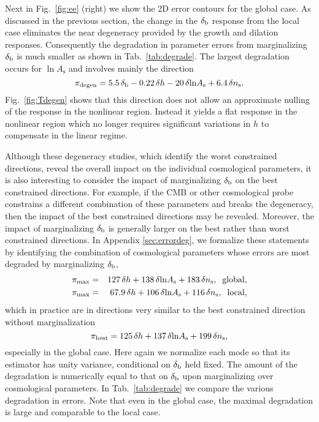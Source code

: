 \documentclass[prd,twocolumn,amsmath,amssymb,floatfix,superscriptaddress]{revtex4-1}
\newcommand{\lnAs}{{\ln\!A_\textrm{s}}}
\newcommand{\ns}{{n_\textrm{s}}}
\newcommand{\br}{{\rm b}}
\begin{document}
{{Next in Fig.~\ref{fig:ee} (right) we show the 2D error contours for
the global case.   As discussed in the previous
section, the change in the $\delta_\br$ response from the local case eliminates
the near degeneracy provided by the growth and dilation responses.
Consequently the degradation in parameter errors from marginalizing $\delta_\br$ 
is much smaller as shown in Tab.~\ref{tab:degrade}.    The largest degradation occurs for
$\lnAs$ and involves mainly the direction 
\begin{equation}
    \pi_{\rm degen} = 5.5\,\delta_\br - 0.22\,\delta h - 20\,\delta\lnAs + 6.4\,\delta\ns.
    \label{eq:globaldegeneracy}
\end{equation}
Fig.~\ref{fig:Tdegen} shows that this direction does not allow  an approximate nulling of the response in the nonlinear region.  Instead it 
 yields a flat response
in the nonlinear region which no longer requires significant variations in $h$ to
compensate in the linear regime.   

Although these degeneracy 
studies, 
which identify the worst constrained directions, 
reveal the overall impact on the individual cosmological parameters, it is also
interesting to consider the impact of marginalizing $\delta_\br$ on the best
constrained directions.    For example, if the CMB or other cosmological probe
constrains a different combination
of these parameters and breaks the degeneracy, then the impact of the best
constrained directions may be revealed.    
Moreover, the impact of marginalizing
$\delta_\br$ is generally larger on the best rather than worst constrained directions. 
In Appendix \ref{sec:errordeg}, we formalize these statements by identifying
the combination of cosmological parameters whose errors are most degraded
by marginalizing $\delta_\br$,
\begin{eqnarray}
    \pi_{\rm max} &=& 127\,\delta h + 138\,\delta\lnAs + 183\,\delta\ns, \;\; \textrm{global},
    \nonumber \\
    \pi_{\rm max} &=& 67.9\,\delta h + 106\,\delta\lnAs + 116\,\delta\ns, \;\; \textrm{local},
    \label{eq:max}
\end{eqnarray}
which in practice are in directions very similar to
the best constrained direction without marginalization
\begin{equation}
    \pi_{\rm best} = 125\,\delta h + 137\,\delta\lnAs + 199\,\delta\ns,
    \label{eq:best}
\end{equation}
especially in the global case.
Here again we normalize each mode so that its estimator has unity variance,
conditional on $\delta_\br$ held fixed.
The amount of the
degradation is numerically equal to that on $\delta_\br$ upon marginalizing over
cosmological parameters.    In Tab.~\ref{tab:degrade} we compare the various degradation
in errors.   Note that even in the global case, the maximal degradation is large
and comparable to the 
{local}
 case.



}}
\end{document}
